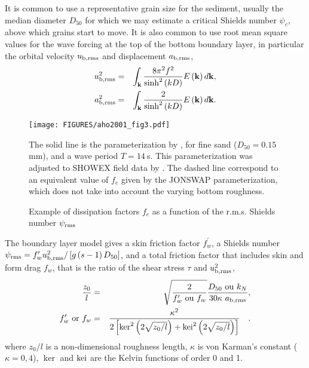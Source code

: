 It is common to use a representative grain size for the sediment, usually the median 
diameter 
$D_{50}$ for which we may estimate a critical Shields number $\psi _{c}$, above which grains start to move. It is also 
common to use root mean square values for the wave forcing at the top of the bottom boundary layer, in particular the 
orbital velocity $u_{\rm b,rms}$ and displacement $a_{\rm b,rms}$,
\begin{eqnarray}
\label{abandub}
u_{\rm b,rms}^{2} &=&\int_{{\mathbf k}}\frac{8\upi ^{2}f^{2}}{\sinh ^{2}\left(
kD\right) }E\left( {\mathbf k}\right) d{\mathbf k},    \label{ub}
\\
a_{\rm b,rms}^{2} &=&\int_{{\mathbf k}}\frac{2}{\sinh ^{2}\left( kD\right) }%
E\left( {\mathbf k}\right) d{\mathbf k}.    \label{ab}
\end{eqnarray}
\begin{figure}[htb]
\centerline{\texttt{[image: FIGURES/aho2001\_fig3.pdf]}}
  \caption{Example of dissipation factors $f_{e}$ as a function of the r.m.s. Shields
number $\psi_{\rm rms}$} {The solid line is the parameterization by \cite{Tolman1994}, for fine sand ($D_{50}=0.15~$mm), and a wave period
 $T=14~$s. This parameterization was adjusted to SHOWEX field data by  \cite{Ardhuin&al.2003b}. 
The dashed line correspond to an equivalent value of $f_{e}$ given by the JONSWAP parameterization, which does not 
take into account the varying bottom roughness.} \label{fig fe from psi}
\end{figure}

The boundary layer model gives a skin friction factor
$f_{w}^{\prime }$,  a Shields number  $\psi_{\rm rms} = f_{w}^{\prime
}u_{\rm b,rms}^{2}/\left[ g\left( s-1\right) D_{50}\right] $, and a total friction factor that includes skin 
and form drag  $f_{w}$, that is the ratio of the shear stress  $\tau$  and  $u_{\rm b,rms}^{2}$,
\begin{eqnarray}
\frac{z_{0}}{l} &=&\sqrt{\frac{2}{f_{w}^{\prime }{\rm~ou~}f_{w}}}\frac{D_{50}
{\rm~ou~}k_{N}}{30\kappa ~a_{\rm b,rms}},  \label{roughness to friction 1}
\\
f_{w}^{\prime }{\rm~or~}f_{w} &=&\frac{\kappa ^{2}}{2\left[ \ker
^{2}\left( 2\sqrt{z_{0}/l}\right) +{\rm kei}^{2}\left( 2\sqrt{z_{0}/l}%
\right) \right] } \quad .    \label{roughness to friction 2}
\end{eqnarray}
where  $z_{0}/l$ is a non-dimensional roughness length,  $\kappa $ is von Karman's constant ($\kappa =0,4$), 
$\ker $ and  ${\rm kei}$ are the Kelvin functions of order  0 and 1.

